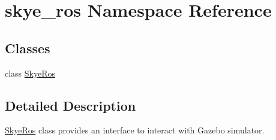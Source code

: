 \hypertarget{namespaceskye__ros}{\section{skye\-\_\-ros Namespace Reference}
\label{namespaceskye__ros}
}
\subsection*{Classes}
\begin{DoxyCompactItemize}
\item 
class \hyperlink{classskye__ros_1_1_skye_ros}{Skye\-Ros}
\end{DoxyCompactItemize}


\subsection{Detailed Description}
\hyperlink{classskye__ros_1_1_skye_ros}{Skye\-Ros} class provides an interface to interact with Gazebo simulator. 